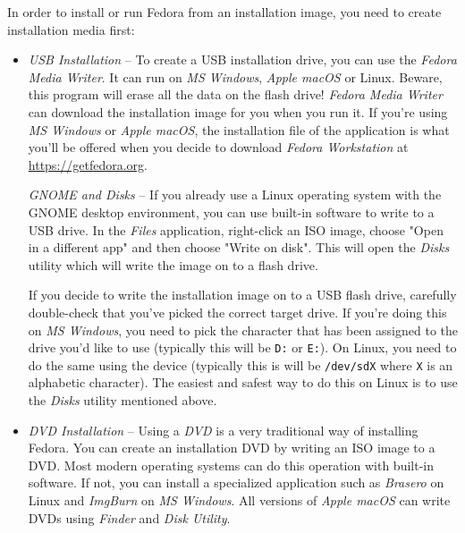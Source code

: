 In order to install or run Fedora from an installation image, you need to create installation media first:
\begin{itemize}
\item\emph{USB Installation} -- To create a USB installation drive, you can use the \emph{Fedora Media Writer}. It can run on \emph{MS Windows}, \emph{Apple macOS} or Linux. Beware, this program will erase all the data on the flash drive! \emph{Fedora Media Writer} can download the installation image for you when you run it. If you're using \emph{MS Windows} or \emph{Apple macOS}, the installation file of the application is what you'll be offered when you decide to download \emph{Fedora Workstation} at \url{https://getfedora.org}.

\emph{GNOME and Disks} -- If you already use a Linux operating system with the GNOME desktop environment, you can use built-in software to write to a USB drive. In the \emph{Files} application, right-click an ISO image, choose "Open in a different app" and then choose "Write on disk". This will open the \emph{Disks} utility which will write the image on to a flash drive.

If you decide to write the installation image on to a USB flash drive, carefully double-check that you've picked the correct target drive. If you're doing this on \emph{MS Windows}, you need to pick the character that has been assigned to the drive you'd like to use (typically this will be \texttt{D:} or \texttt{E:}). On Linux, you need to do the same using the device (typically this is will be \texttt{/dev/sdX} where \texttt{X} is an alphabetic character). The easiest and safest way to do this on Linux is to use the \emph{Disks} utility mentioned above.

\item\emph{DVD Installation} -- Using a \emph{DVD} is a very traditional way of installing Fedora. You can create an installation DVD by writing an ISO image to a DVD. Most modern operating systems can do this operation with built-in software. If not, you can install a specialized application such as \emph{Brasero} on Linux and \emph{ImgBurn} on \emph{MS Windows}. All versions of \emph{Apple macOS} can write DVDs using \emph{Finder} and \emph{Disk Utility}.
\end{itemize}

